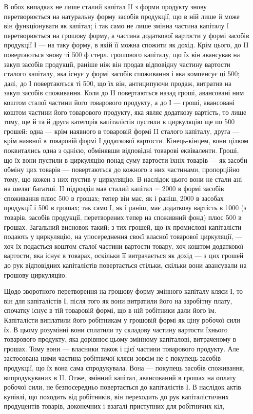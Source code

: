 В обох випадках не лише сталий капітал II з форми продукту знову
перетворюється на натуральну форму засобів продукції, що в ній лише
й може він функціонувати як капітал; і так само не лише змінна частина
капіталу І перетворюється на грошову форму, а частина додаткової вартости
у формі засобів продукції І — на таку форму, в якій її можна спожити
як дохід. Крім цього, до II повертаються знову ті 500 ф стерл. грошового
капіталу, що їх він авансував на закуп засобів продукції, раніше ніж він
продав відповідну частину вартости сталого капіталу, яка існує у формі
засобів споживання і яка компенсує ці 500; далі, до І повертаються
ті 500, що їх він, антиципуючи продаж, витратив на
закуп засобів споживання. Коли до II повертаються назад гроші, авансовані
ним коштом сталої частини його товарового продукту, а до І — гроші,
авансовані коштом частини його товарового продукту, яка являє додаткозу
вартість, то лише тому, ще й та й друга категорія капіталістів пустили
в циркуляцію ще по 500 грошей: одна — крім наявного
в товаровій формі II сталого капіталу, друга — крім наявної в товаровій
формі І додаткової вартости. Кінець-кінцем, вони цілком поквитались одна
з однією, обмінявши відповідні товарові еквіваленти. Гроші, що їх вони
пустили в циркуляцію понад суму вартости їхніх товарів — як засоби обміну
цих товарів — повертаються до кожного з них частинами, пропорційно
тому, що кожен з них пустив у циркуляцію. В наслідок цього вони не
стали ані на шеляг багатші. II підрозділ мав сталий капітал = 2000 в формі
засобів споживання плюс 500 в грошах; тепер він має, як і раніш, 2000
в засобах продукції і 500 в грошах; так само І, як і раніш, має додаткову
вартість в 1000 (з товарів, засобів продукції, перетворених тепер
на споживний фонд) плюс 500 в грошах. Загальний висновок такий:
з тих грошей, що їх промислові капіталісти подають у циркуляцію, на
упосереднення своєї власної товарової циркуляції, — хоч їх подається
коштом сталої частини вартости товару, хоч коштом додаткової вартости,
яка існує в товарах, оскільки її витрачається як дохід — з цих грошей до
рук відповідних капіталістів повертається стільки, скільки вони авансували
на грошову циркуляцію.

Щодо зворотного перетворення на грошову форму змінного капіталу
кляси І, то він для капіталістів І, після того як вони витратили його на
заробітну плату, спочатку існує в тій товаровій формі, що в ній робітники
дали його їм. Капіталісти виплатили його робітникам у грошовій
формі як ціну робочої сили їх. В цьому розумінні вони сплатили ту
складову частину вартости їхнього товарового продукту, яка дорівнює
цьому змінному капіталові, витраченому в грошах. Тому вони — власники також
і цієї частини товарового продукту. Але застосована ними частина робітничої
кляси зовсім не є покупець засобів продукції, що їх вона сама
спродукувала. Вона — покупець засобів споживання, випродукуваних в II.
Отже, змінний капітал, авансований в грошах на оплату робочої сили, не
безпосередньо повертається до капіталістів І. В наслідок актів купівлі,
що походить від робітників, він переходить до рук капіталістичних продуцентів
товарів, доконечних і взагалі приступних для робітничих кіл,
\parbreak{}  %
